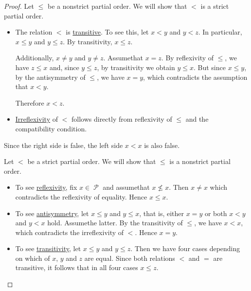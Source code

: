 \begin{proof}
   Let \( \leq \) be a nonstrict partial order. We will show that \( < \) is a strict partial order.

  \begin{itemize}
    \item The relation \( < \) is \hyperref[def:binary_relation/transitive]{transitive}. To see this, let \( x < y \) and \( y < z \). In particular, \( x \leq y \) and \( y \leq z \). By transitivity, \( x \leq z \).

    Additionally, \( x \neq y \) and \( y \neq z \). Assume\DNE that \( x = z \). By reflexivity of \( \leq \), we have \( z \leq x \) and, since \( y \leq z \), by transitivity we obtain \( y \leq x \). But since \( x \leq y \), by the antisymmetry of \( \leq \), we have \( x = y \), which contradicts the assumption that \( x < y \).

    Therefore \( x < z \).

    \item \hyperref[def:binary_relation/irreflexive]{Irreflexivity} of \( < \) follows directly from reflexivity of \( \leq \) and the compatibility condition.
  \end{itemize}

  Since the right side is false, the left side \( x < x \) is also false.

   Let \( < \) be a strict partial order. We will show that \( \leq \) is a nonstrict partial order.

  \begin{itemize}
    \item To see \hyperref[def:binary_relation/reflexive]{reflexivity}, fix \( x \in \mscrP \) and assume\DNE that \( x \not\leq x \). Then \( x \neq x \) which contradicts the reflexivity of equality. Hence \( x \leq x \).

    \item To see \hyperref[def:binary_relation/antisymmetric]{antisymmetry}, let \( x \leq y \) and \( y \leq x \), that is, either \( x = y \) or both \( x < y \) and \( y < x \) hold. Assume\DNE the latter. By the transitivity of \( \leq \), we have \( x < x \), which contradicts the irreflexivity of \( < \). Hence \( x = y \).

    \item To see \hyperref[def:binary_relation/transitive]{transitivity}, let \( x \leq y \) and \( y \leq z \). Then we have four cases depending on which of \( x \), \( y \) and \( z \) are equal. Since both relations \( < \) and \( = \) are transitive, it follows that in all four cases \( x \leq z \).
  \end{itemize}
\end{proof}

